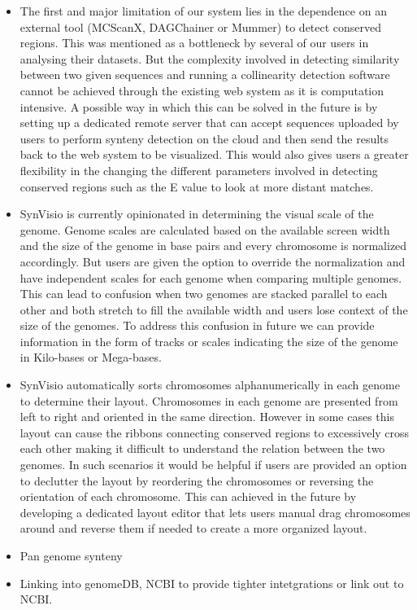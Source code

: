  \begin{itemize}
    \item The first and major limitation of our system lies in the dependence on an external tool (MCScanX, DAGChainer or Mummer) to detect conserved regions. This was mentioned as a bottleneck by several of our users in analysing their datasets. But the complexity involved in detecting similarity between two given sequences and running a collinearity detection software cannot be achieved through the existing web system as it is computation intensive. A possible way in which this can be solved in the future is by setting up a dedicated remote server that can accept sequences uploaded by users to perform synteny detection on the cloud and then send the results back to the web system to be visualized. This would also gives users a greater flexibility in the changing the different parameters involved in detecting conserved regions such as the E value  to look at more distant matches.    
    
    \item SynVisio is currently opinionated in determining the visual scale of the genome. Genome scales are  calculated based on the available screen width and the size of the genome in base pairs and every chromosome is normalized accordingly. But users are given the option to override the normalization and have independent scales for each genome when comparing multiple genomes. This can lead to confusion when two genomes are stacked parallel to each other and both stretch to fill the available width and users lose context of the size of the genomes. To address this confusion in future we can provide information in the form of tracks or scales indicating the size of the genome in Kilo-bases or Mega-bases.
    
    \item SynVisio automatically sorts chromosomes alphanumerically in each genome to determine their layout. Chromosomes in each genome are presented from left to right and oriented in the same direction. However in some cases this layout can cause the ribbons connecting conserved regions to excessively cross each other making it difficult to understand the relation between the two genomes. In such scenarios it would be helpful if users are provided an option to declutter the layout by reordering the chromosomes or reversing the orientation of each chromosome. This can achieved in the future by developing a dedicated layout editor that lets users manual drag chromosomes around and reverse them if needed to create a more organized layout.
    
    \item Pan genome synteny
    \item Linking into genomeDB, NCBI to provide tighter intetgrations or link out to NCBI.
        


\end{itemize}
 
